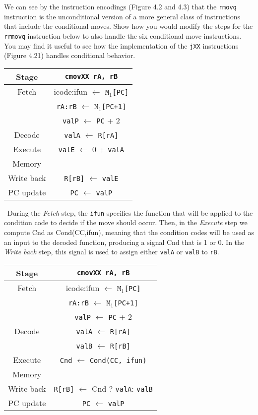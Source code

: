 \documentclass[12pt]{article}
\newenvironment{ex}[2][Exercise]{\begin{trivlist}
		\item[\hskip \labelsep {\bfseries #1}\hskip \labelsep {\bfseries #2.}]}{\end{trivlist}}
\newenvironment{sol}[1][Solution]{\begin{trivlist}
		\item[\hskip \labelsep {\bfseries #1:}]}{\end{trivlist}}
\begin{document}
\begin{ex}{4.17}
	We can see by the instruction encodings (Figure 4.2 and 4.3) that the
	\texttt{rmovq} instruction is the unconditional version of a more general
	class of instructions that include the conditional moves. Show how you would
	modify the steps for the \texttt{rrmovq} instruction below to also handle the
	six conditional move instructions. You may find it useful to see how the
	implementation of the \texttt{jXX} instructions (Figure 4.21) handles conditional
	behavior.
	\begin{center}
		\begin{tabular}{cc}
			Stage & \texttt{cmovXX rA, rB}\\
			\hline
			Fetch & icode:ifun $\leftarrow$ $\texttt{M}_1$\texttt{[PC]}\\
			{} & \texttt{rA:rB} $\leftarrow$ $\texttt{M}_1$\texttt{[PC+1]}\\
			{} & \texttt{valP} $\leftarrow$ \texttt{PC} + 2\\
			Decode & \texttt{valA} $\leftarrow$ \texttt{R[rA]}\\
			Execute & \texttt{valE} $\leftarrow$ 0 + \texttt{valA}\\
			Memory & {}\\
			Write back & \texttt{R[rB]} $\leftarrow$ \texttt{valE}\\
			PC update & \texttt{PC} $\leftarrow$ \texttt{valP}
		\end{tabular}
	\end{center}
\end{ex}

\begin{sol}
	\
	During the \emph{Fetch} step, the \texttt{ifun} specifies the function
	that will be applied to the condition code to decide if the move should
	occur. Then, in the \emph{Execute} step we compute Cnd as Cond(CC,ifun),
	meaning that the condition codes will be used as an input to the decoded
	function, producing a signal Cnd that is 1 or 0. In the \emph{Write back}
	step, this signal is used to assign either \texttt{valA} or \texttt{valB}
	to \texttt{rB}.
	\begin{center}
		\begin{tabular}{cc}
			Stage & \texttt{cmovXX rA, rB}\\
			\hline
			Fetch & icode:ifun $\leftarrow$ $\texttt{M}_1$\texttt{[PC]}\\
			{} & \texttt{rA:rB} $\leftarrow$ $\texttt{M}_1$\texttt{[PC+1]}\\
			{} & \texttt{valP} $\leftarrow$ \texttt{PC} + 2\\
			Decode & \texttt{valA} $\leftarrow$ \texttt{R[rA]}\\
			{} & \texttt{valB} $ \leftarrow$ \texttt{R[rB]}\\
			Execute & \texttt{Cnd} $ \leftarrow$ \texttt{Cond(CC, ifun)}\\
			Memory & {}\\
			Write back & \texttt{R[rB]} $\leftarrow$ Cnd ? \texttt{valA}: \texttt{valB}\\
			PC update & \texttt{PC} $\leftarrow$ \texttt{valP}
		\end{tabular}
	\end{center}
\end{sol}
\end{document}
